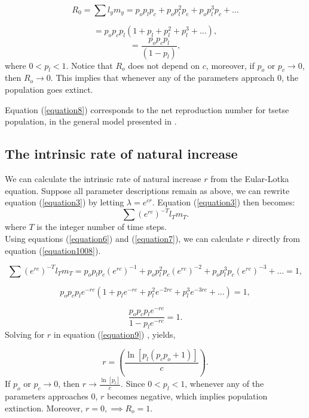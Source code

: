 \documentclass[12pt,a4paper]{article}
\begin{document}
$$R_{0 }=\sum l_{y}m_{y} = p_op_lp_c + p_op_l^2 p_c + p_op_l^3p_c + ...$$

$$=p_op_cp_l (1 + p_l + p_l^2 + p_l^3 + ...),$$
\begin{equation}
\label{equation8} 
=\frac{p_op_cp_l}{(1-p_l)},
\end{equation}
where $0 < p_l < 1$. Notice that $R_o$ does not depend on $c$, moreover, if $p_o$ or $p_c \rightarrow{0}$, then $R_o \rightarrow{0}$. This implies that whenever any of the parameters approach $0$, the population goes extinct.

Equation  (\ref{equation8}) corresponds to the net reproduction number for tsetse population, in the general model presented in \cite{Are2019a}.

\subsection*{The intrinsic rate of natural increase}
We can calculate the intrinsic rate of natural increase $r$ from the  Eular-Lotka equation.  Suppose all parameter descriptions remain as above, we can rewrite equation (\ref{equation3}) by letting $\lambda= e^{cr}$. Equation (\ref{equation3}) then becomes:
\begin{equation}
\label{equation1008} 
\sum (e^{rc})^{-T}l_{T}m_{T}.
\end{equation}
where $ T $ is the integer number of time steps. \\

Using equations  (\ref{equation6}) and  (\ref{equation7}), we can calculate $r$ directly from equation (\ref{equation1008}).

$$\sum (e^{rc})^{-T}l_{T}m_{T} = p_op_lp_c(e^{rc})^{-1} + p_op_l^2p_c(e^{rc})^{-2} + p_op_l^3p_c(e^{rc})^{-3} + ...=1,$$



$$p_op_cp_le^{-rc} (1 + p_le^{-rc} + p_l^2e^{-2rc} + p_l^3e^{-3rc}+ ...) =1,$$

\begin{equation}
\label{equation9} 
\frac{p_op_cp_le^{-rc}}{1-p_le^{-rc}} =1.
\end{equation}
Solving for $r$ in equation (\ref{equation9}) , yields, 

\begin{equation}
\label{equation13} 
r = (\frac{\ln[p_l(p_cp_o+1)]}{c}).
\end{equation}
If  $p_o$ or $p_c \rightarrow{0}$, then  $r \rightarrow{\frac{\ln[p_l]}{c}}$. Since $0 < p_l < 1$, whenever any of the parameters approaches $0$, $r$ becomes negative, which implies  population extinction. Moreover, $r = 0, \implies R_o = 1$.  
\end{document}
